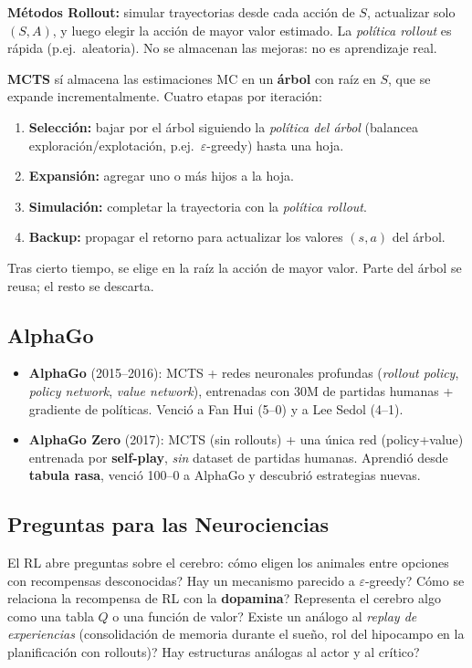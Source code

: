 \documentclass[11pt, a4paper]{article}
\begin{document}
\textbf{M\'etodos Rollout:} simular trayectorias desde cada acci\'on de $S$, actualizar solo $(S,A)$, y luego elegir la acci\'on de mayor valor estimado. La \emph{pol\'itica rollout} es r\'apida (p.ej.\ aleatoria). No se almacenan las mejoras: no es aprendizaje real.

\textbf{MCTS} s\'i almacena las estimaciones MC en un \textbf{\'arbol} con ra\'iz en $S$, que se expande incrementalmente. Cuatro etapas por iteraci\'on:
\begin{enumerate}[nosep]
    \item \textbf{Selecci\'on:} bajar por el \'arbol siguiendo la \emph{pol\'itica del \'arbol} (balancea exploraci\'on/explotaci\'on, p.ej.\ $\varepsilon$-greedy) hasta una hoja.
    \item \textbf{Expansi\'on:} agregar uno o m\'as hijos a la hoja.
    \item \textbf{Simulaci\'on:} completar la trayectoria con la \emph{pol\'itica rollout}.
    \item \textbf{Backup:} propagar el retorno para actualizar los valores $(s,a)$ del \'arbol.
\end{enumerate}
Tras cierto tiempo, se elige en la ra\'iz la acci\'on de mayor valor. Parte del \'arbol se reusa; el resto se descarta.

\subsection{AlphaGo}
\begin{itemize}[nosep]
    \item \textbf{AlphaGo} (2015--2016): MCTS + redes neuronales profundas (\emph{rollout policy}, \emph{policy network}, \emph{value network}), entrenadas con 30M de partidas humanas + gradiente de pol\'iticas. Venci\'o a Fan Hui (5--0) y a Lee Sedol (4--1).
    \item \textbf{AlphaGo Zero} (2017): MCTS (sin rollouts) + una \'unica red (policy+value) entrenada por \textbf{self-play}, \emph{sin} dataset de partidas humanas. Aprendi\'o desde \textbf{tabula rasa}, venci\'o 100--0 a AlphaGo y descubri\'o estrategias nuevas.
\end{itemize}

\subsection{Preguntas para las Neurociencias}
El RL abre preguntas sobre el cerebro: \textquestiondown c\'omo eligen los animales entre opciones con recompensas desconocidas? \textquestiondown Hay un mecanismo parecido a $\varepsilon$-greedy? \textquestiondown C\'omo se relaciona la recompensa de RL con la \textbf{dopamina}? \textquestiondown Representa el cerebro algo como una tabla $Q$ o una funci\'on de valor? \textquestiondown Existe un an\'alogo al \emph{replay de experiencias} (consolidaci\'on de memoria durante el sue\~no, rol del hipocampo en la planificaci\'on con rollouts)? \textquestiondown Hay estructuras an\'alogas al actor y al cr\'itico?
\end{document}
